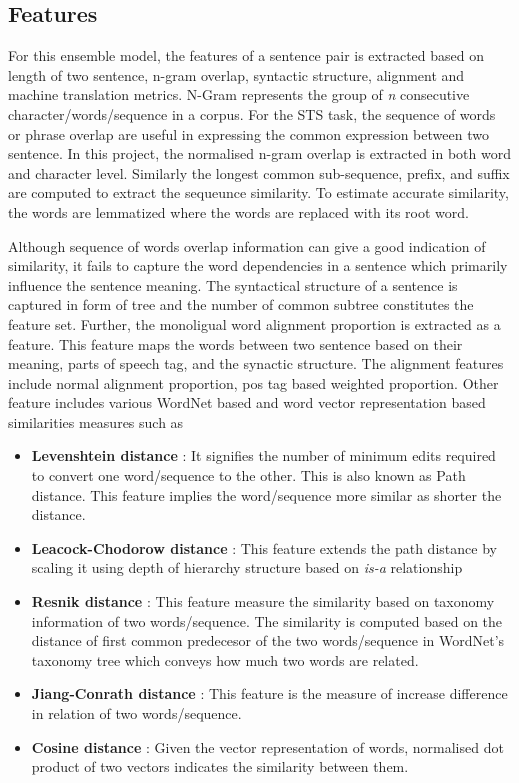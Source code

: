 \documentclass[12pt]{report} %
\begin{document}
	\subsection{Features}
	For this ensemble model, the features of a sentence pair is extracted based on length of two sentence, n-gram overlap, syntactic structure, alignment and machine translation metrics. N-Gram represents the group of \textit{n} consecutive character/words/sequence in a corpus. For the STS task, the  sequence of words or phrase overlap are useful in expressing the common expression between two sentence. In this project, the normalised n-gram overlap is extracted in both word and character level. Similarly the longest common sub-sequence, prefix, and suffix are computed to extract the sequeunce similarity. To estimate accurate similarity, the words are lemmatized where the words are replaced with its root word. 
	
	Although sequence of words overlap information can give a good indication of similarity, it fails to capture the word dependencies in a sentence which primarily influence the sentence meaning. The syntactical structure of a sentence is captured in form of tree and the number of common subtree constitutes the feature set. Further, the monoligual word alignment proportion is extracted as a feature. This feature maps the words between two sentence based on their meaning, parts of speech tag, and the synactic structure. The alignment features include normal alignment proportion, pos tag based weighted proportion. Other feature includes various WordNet based and word vector representation based similarities measures such as
	
	\begin{itemize}
		\item \textbf{Levenshtein distance} : It signifies the number of minimum edits required to convert one word/sequence to the other. This is also known as Path distance. This feature  implies the word/sequence more similar as shorter the distance. 
		\item\textbf{Leacock-Chodorow distance} : This feature extends the path distance by scaling it using depth of hierarchy structure based on \textit{is-a } relationship
		\item \textbf{Resnik distance} : This feature measure the similarity based on taxonomy information of two words/sequence. The similarity is computed based on the distance of first common predecesor of the two words/sequence in WordNet's taxonomy tree which conveys how much two words are related.
		
		\item \textbf{Jiang-Conrath distance} : This feature is the measure of increase difference in relation of two words/sequence.  
		\item \textbf{Cosine distance} : Given the vector representation of words, normalised dot product of two vectors indicates the similarity between them.
	\end{itemize}
	
\end{document}

